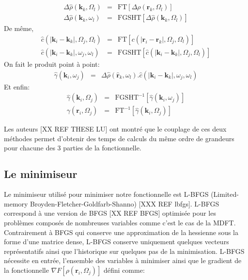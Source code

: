 \begin{eqnarray}
\Delta\hat{\rho}\left(\boldsymbol{k}_k,\Omega_l\right) &=& \mathrm{FT}[\Delta\rho\left(\boldsymbol{r}_k,\Omega_l\right)] \\
\Delta\hat{\rho}\left(\boldsymbol{k}_k,\omega_l\right) &=& \mathrm{FGSHT}[\Delta\hat{\rho}\left(\boldsymbol{k}_k,\Omega_l\right)]
\end{eqnarray}
De même,
\begin{eqnarray}
\hat{c}\left( \left|\boldsymbol{k}_i-\boldsymbol{k}_k\right|,\Omega_j,\Omega_l \right) &=& \mathrm{FT}[c\left( \left|\boldsymbol{r}_i-\boldsymbol{r}_k\right|,\Omega_j,\Omega_l \right)] \\
\hat{c}\left( \left|\boldsymbol{k}_i-\boldsymbol{k}_k\right|,\omega_j,\omega_l \right) &=& \mathrm{FGSHT}[\hat{c}\left( 
\left|\boldsymbol{k}_i-\boldsymbol{k}_k\right|,\Omega_j,\Omega_l \right)]
\end{eqnarray}
On fait le produit point à point:
\begin{eqnarray}
\hat{\gamma}(\boldsymbol{k}_i,\omega_j) &=& \Delta\hat{\rho}\left(\boldsymbol{\hat{r}}_k,\omega_l\right) . \hat{c}\left( \left|\boldsymbol{k}_i-\boldsymbol{k}_k\right|,\omega_j,\omega_l \right)
\end{eqnarray}
Et enfin:
\begin{eqnarray}
\hat{\gamma}(\boldsymbol{k}_i,\Omega_j) &=& \mathrm{FGSHT}^{-1}[\hat{\gamma}(\boldsymbol{k}_i,\omega_j)]\\
\gamma(\boldsymbol{r}_i,\Omega_j) &=& \mathrm{FT}^{-1}[\hat{\gamma}(\boldsymbol{k}_i,\Omega_j)]
\end{eqnarray}

Les auteurs [XX REF THESE LU] ont montré que le couplage de ces deux méthodes permet d'obtenir des temps de calculs du même ordre de grandeurs pour chacune des 3 parties de la fonctionnelle. 


\subsection{Le minimiseur}
Le minimiseur utilisé pour minimiser notre fonctionnelle est L-BFGS (Limited-memory Broyden-Fletcher-Goldfarb-Shanno) [XXX REF lbfgs]. L-BFGS correspond à une version de BFGS [XX REF BFGS] optimisée pour les problèmes composés de nombreuses variables comme c'est le cas de la MDFT. Contrairement à BFGS qui conserve une approximation de la hessienne sous la forme d'une matrice dense, L-BFGS conserve uniquement quelques vecteurs représentatifs ainsi que l'historique sur quelques pas de la minimisation. L-BFGS nécessite en entrée, l'ensemble des variables à minimiser ainsi que le gradient de la fonctionnelle $\nabla F[\rho\left(\boldsymbol{r}_i,\Omega_j\right)]$ défini comme:


